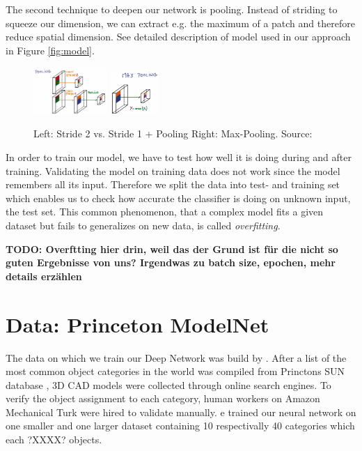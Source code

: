 \documentclass[10pt,twocolumn,letterpaper]{article}
\begin{document}
The second technique to deepen our network is pooling. Instead of striding to squeeze our dimension, we can extract e.g. the maximum of a patch and therefore reduce spatial dimension. 
See detailed description of model used in our approach in Figure \ref{fig:model}.

\begin{figure}[h]
	\label{fig:pooling}
	\includegraphics[width=0.25\textwidth]{figures/con_max}
	\includegraphics[width=0.16\textwidth]{figures/max}
	\caption{Left: Stride 2 vs. Stride 1 + Pooling \quad Right: Max-Pooling. Source: \cite{udacity}}
\end{figure}

In order to train our model, we have to test how well it is doing during and after training. 
Validating the model on training data does not work since the model remembers all its input. Therefore we split the data into test- and training set which enables us to check how accurate the classifier is doing on unknown input, the test set. This common phenomenon, that a complex model fits a given dataset but fails to generalizes on new data, is called \textit{overfitting}.

\textbf{TODO: Overftting hier drin, weil das der Grund ist für die nicht so guten Ergebnisse von uns?
Irgendwas zu batch size, epochen, mehr details erzählen}

\section{Data: Princeton ModelNet}

The data on which we train our Deep Network was build by \cite{shape}. After a list of the most
common object categories in the world was compiled from Princtons SUN database \cite{sun}, 3D CAD models were collected through online 
search engines. To verify the object assignment to each category, human workers on Amazon Mechanical Turk were hired to validate manually. 
e trained our neural network on one smaller and one larger dataset containing 10 respectivally 40 categories which each ?XXXX? objects.
\end{document}
